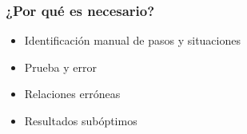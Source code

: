 \begin{frame}
	\frametitle{¿Por qu\'e es necesario?}
	
	\begin{itemize}
		\item Identificaci\'on manual de pasos y situaciones
		\item Prueba y error
		\item Relaciones err\'oneas
		\item Resultados sub\'optimos
	\end{itemize}
\end{frame}